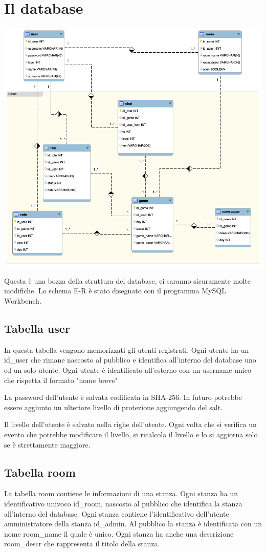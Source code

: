 \documentclass[10pt,a4paper]{article}
\begin{document}
\section{Il database}
\includegraphics[width = \textwidth]{database.png}

Questa è una bozza della struttura del database, ci saranno sicuramente molte modifiche. Lo schema E-R è stato disegnato con il programma \textsf{MySQL Workbench}.

\subsection{Tabella user}
In questa tabella vengono memorizzati gli utenti registrati. Ogni utente ha un \textsf{id\_user} che rimane nascosto al pubblico e identifica all'interno del database uno ed un solo utente. Ogni utente è identificato all'esterno con un \textsf{username} unico che rispetta il formato "nome breve"

La password dell'utente è salvata codificata in SHA-256. In futuro potrebbe essere aggiunto un ulteriore livello di protezione aggiungendo del salt.

Il livello dell'utente è salvato nella righe dell'utente. Ogni volta che si verifica un evento che potrebbe modificare il livello, si ricalcola il livello e lo si aggiorna solo se è strettamente maggiore.

\subsection{Tabella room}
La tabella \textsf{room} contiene le informazioni di una stanza. Ogni stanza ha un identificativo univoco \textsf{id\_room}, nascosto al pubblico che identifica la stanza all'interno del database. Ogni stanza contiene l'identificativo dell'utente amministratore della stanza \textsf{id\_admin}. Al pubblico la stanza è identificata con un nome \textsf{room\_name} il quale è unico. Ogni stanza ha anche una descrizione \textsf{room\_descr} che rappresenta il titolo della stanza. 
\end{document}
